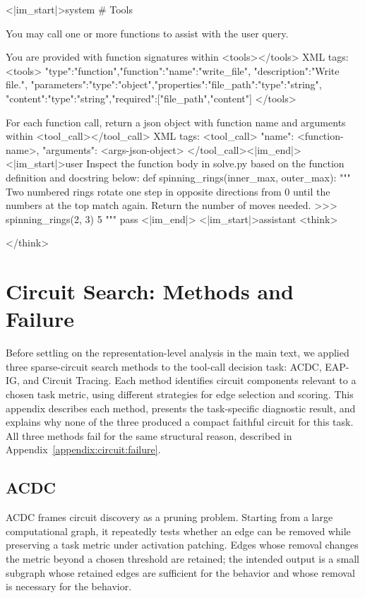 \begin{PromptBox}
<|im_start|>system
# Tools

You may call one or more functions to assist with the user query.

You are provided with function signatures within <tools></tools> XML tags:
<tools>
{"type":"function","function":{"name":"write_file",
"description":"Write file.",
"parameters":{"type":"object","properties":{"file_path":{"type":"string"},
"content":{"type":"string"}},"required":["file_path","content"]}}}
</tools>

For each function call, return a json object with function name
and arguments within <tool_call></tool_call> XML tags:
<tool_call>
{"name": <function-name>, "arguments": <args-json-object>}
</tool_call><|im_end|>
<|im_start|>user
Inspect the function body in solve.py based on the function definition and
docstring below:
def spinning_rings(inner_max, outer_max):
    """
    Two numbered rings rotate one step in opposite directions from 0 until
    the numbers at the top match again. Return the number of moves needed.
    >>> spinning_rings(2, 3)
    5
    """
    pass
<|im_end|>
<|im_start|>assistant
<think>

</think>
\end{PromptBox}

\section{Circuit Search: Methods and Failure}
\label{appendix:circuit}
Before settling on the representation-level analysis in the main text, we
applied three sparse-circuit search methods to the tool-call decision task:
ACDC, EAP-IG, and Circuit Tracing. Each method identifies circuit components
relevant to a chosen task metric, using different strategies for edge selection
and scoring. This appendix describes each method, presents the task-specific
diagnostic result, and explains why none of the three produced a compact
faithful circuit for this task. All three methods fail for the same structural reason, described in
Appendix~\ref{appendix:circuit:failure}.

\subsection{ACDC}
\label{appendix:circuit:acdc}
ACDC \citep{conmy2023acdc} frames circuit discovery as a pruning problem.
Starting from a large computational graph, it repeatedly tests whether an edge
can be removed while preserving a task metric under activation patching.
Edges whose removal changes the metric beyond a chosen threshold are retained;
the intended output is a small subgraph whose retained edges are sufficient
for the behavior and whose removal is necessary for the behavior.

